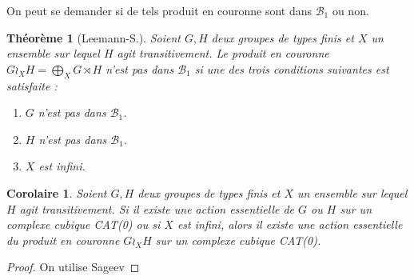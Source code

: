 \documentclass[a4paper]{article}
\newtheorem{cor}[lem]{Corolaire}
\newtheorem{thm}[lem]{Théorème}
\theoremstyle{remark}%
\newcommand*{\B}{\mathcal{B}_1}
\begin{document}
On peut se demander si de tels produit en couronne sont dans $\B$ ou non.
%
\begin{thm}[Leemann-S.]
Soient $G,H$ deux groupes de types finis et $X$ un ensemble sur lequel $H$ agit transitivement. Le produit en couronne $G \wr_X H = \bigoplus_X G \rtimes H$ n'est pas dans $\B$ si une des trois conditions suivantes est satisfaite :
\begin{enumerate}
\item $G$ n'est pas dans $\B$.
\item $H$ n'est pas dans $\B$.
\item $X$ est infini.
\end{enumerate}
\end{thm}
%
\begin{cor}
Soient $G,H$ deux groupes de types finis et $X$ un ensemble sur lequel $H$ agit transitivement. Si il existe une action essentielle de $G$ ou $H$ sur un complexe cubique CAT(0) ou si $X$ est infini, alors il existe une action essentielle du produit en couronne $G\wr_XH$ sur un complexe cubique CAT(0).
\end{cor}
%
\begin{proof}
On utilise Sageev
\end{proof}
%
\end{document}
